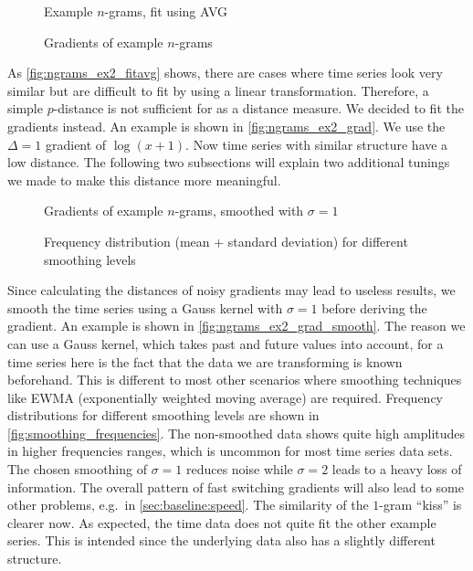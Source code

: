 \begin{figure}
    \centering
    
    \caption{Example $n$-grams, fit using AVG}\label{fig:ngrams_ex2_fitavg}
\end{figure}

\begin{figure}
    \centering
    
    \caption{Gradients of example $n$-grams}\label{fig:ngrams_ex2_grad}
\end{figure}

As \autoref{fig:ngrams_ex2_fitavg} shows, there are cases where time series look very similar but are difficult to fit by using a linear transformation. Therefore, a simple $p$-distance is not sufficient for as a distance measure. We decided to fit the gradients instead. An example is shown in \autoref{fig:ngrams_ex2_grad}. We use the $\Delta = 1$ gradient of $\log(x + 1)$. Now time series with similar structure have a low distance. The following two subsections will explain two additional tunings we made to make this distance more meaningful.

\begin{figure}
    \centering
    
    \caption{Gradients of example $n$-grams, smoothed with $\sigma = 1$}\label{fig:ngrams_ex2_grad_smooth}
\end{figure}

\begin{figure}
    \centering
    
    \caption{Frequency distribution (mean + standard deviation) for different smoothing levels}\label{fig:smoothing_frequencies}
\end{figure}

Since calculating the distances of noisy gradients may lead to useless results, we smooth the time series using a Gauss kernel with $\sigma = 1$ before deriving the gradient. An example is shown in \autoref{fig:ngrams_ex2_grad_smooth}. The reason we can use a Gauss kernel, which takes past and future values into account, for a time series here is the fact that the data we are transforming is known beforehand. This is different to most other scenarios where smoothing techniques like EWMA (exponentially weighted moving average) are required. Frequency distributions for different smoothing levels are shown in \autoref{fig:smoothing_frequencies}. The non-smoothed data shows quite high amplitudes in higher frequencies ranges, which is uncommon for most time series data sets. The chosen smoothing of $\sigma = 1$ reduces noise while $\sigma = 2$ leads to a heavy loss of information. The overall pattern of fast switching gradients will also lead to some other problems, e.g.\ in \autoref{sec:baseline:speed}. The similarity of the $1$-gram \enquote{kiss} is clearer now. As expected, the time data does not quite fit the other example series. This is intended since the underlying data also has a slightly different structure.


